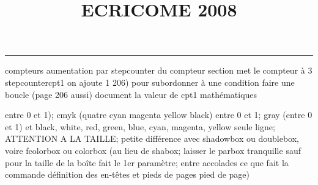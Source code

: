 \documentclass[11pt]{article}%
\title{\bf \vspace{-2cm} ECRICOME 2008} %
\author{} %
\date{} %
\renewcommand{\headrulewidth}{0pt}%
\renewcommand{\footrulewidth}{0.4pt}%
\begin{document}
\maketitle %
\vspace{-1.4cm}\hrule %
\thispagestyle{fancy}

\vspace*{.2cm}



compteurs%
aumentation par stepcounter du compteur section%
met le compteur à 3%
stepcounter{cpt1} on ajoute 1%
206) pour subordonner à une condition %
faire une boucle (page 206 aussi) %
document la valeur de cpt1 
mathématiques\newcommand{\ch}{\operatorname{ch}} 
\newcommand{\sh}{\operatorname{sh}}
\renewcommand{\tanh}{\operatorname{th}}
\renewcommand{\sinh}{\operatorname{sh}}
\renewcommand{\cosh}{\operatorname{ch}}
\newcommand{\argsh}{\operatorname{argsh}}
\newcommand{\argch}{\operatorname{argch}}
\newcommand{\argth}{\operatorname{argth}}
\newcommand{\Id}{\operatorname{Id}}
\renewcommand{\leq}{\leq}
\renewcommand{\geq}{\geq }

\newcommand{\dlim}{\lim}
\newcommand{\dsum}{\sum}
\newcommand{\dprod}{\prod}



entre 0 et 1); cmyk (quatre cyan magenta yellow black) entre 0 et 1;
gray (entre 0 et 1) et black, white, red, green, blue, cyan, magenta,
yellow%
seule ligne; ATTENTION A LA TAILLE; petite différence avec shadowbox ou
doublebox, voire fcolorbox ou colorbox (au lieu de shabox; laisser le
parbox tranquille sauf pour la taille de la boîte
\newcommand{\Tbox}[1]{\begin{center} \shabox{\parbox{0.6
\linewidth}{#1}} \end{center}} %
fait le 1er paramètre; entre accolades ce que fait la commande
définition des en-têtes et pieds de pages\pagestyle{fancy}
\chead{}
\rfoot[ \ \thepage]{\thepage}
\cfoot{}
\lfoot{}
\thispagestyle{fancy} %
pied de page)\renewcommand{\footrulewidth}{0.4pt}
\renewcommand{\headrulewidth}{0.4pt}
\end{document}
